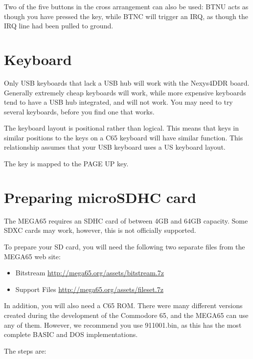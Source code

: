 Two of the five buttons in the cross arrangement can also be used:  BTNU acts as though you have pressed the  key, while BTNC will trigger an IRQ, as though the IRQ line had been pulled to ground.

\section{Keyboard}

Only USB keyboards that lack a USB hub will work with the Nexys4DDR board.  Generally extremely cheap keyboards will work, while more expensive keyboards tend to have a USB hub integrated, and will not work.  You may need to try several keyboards, before you find one that works.

The keyboard layout is positional rather than logical.
This means that keys in similar positions to the keys on a C65 keyboard will have similar function.
This relationship assumes that your USB keyboard uses a US keyboard layout.

The  key is mapped to the PAGE UP key.

\newpage

\section{Preparing microSDHC card}

The MEGA65 requires an SDHC card of between 4GB and 64GB capacity.  Some SDXC cards may work, however, this is not officially supported.

To prepare your SD card, you will need the following two separate files from the MEGA65 web site:

\begin{itemize}
\item{Bitstream} \url{http://mega65.org/assets/bitstream.7z}
\item{Support Files} \url{http://mega65.org/assets/fileset.7z}
\end{itemize}

In addition, you will also need a C65 ROM.  There were many different versions created during the development of the Commodore 65,
and the MEGA65 can use any of them.  However, we recommend you use 911001.bin, as this has the most complete BASIC and DOS implementations.

The steps are:

